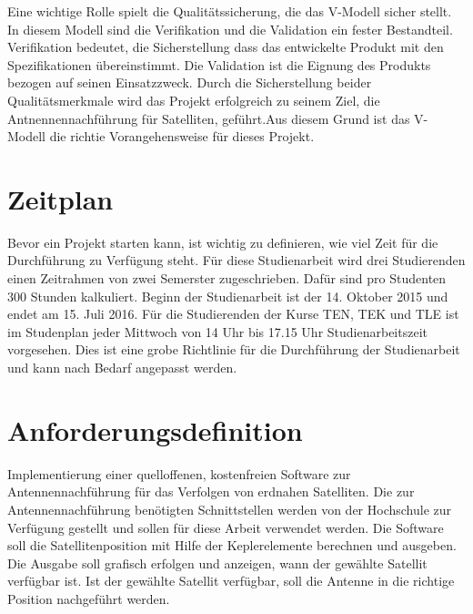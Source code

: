 Eine wichtige Rolle spielt die Qualitätssicherung, die das V-Modell sicher stellt. In diesem Modell sind die Verifikation und die Validation ein 
fester Bestandteil. Verifikation bedeutet, die Sicherstellung dass das entwickelte Produkt mit den Spezifikationen übereinstimmt.
Die Validation ist die Eignung des Produkts bezogen auf seinen Einsatzzweck. Durch die Sicherstellung beider Qualitätsmerkmale wird das Projekt 
erfolgreich zu seinem Ziel, die Antnennennachführung für Satelliten, geführt.Aus diesem Grund ist das V-Modell die richtie Vorangehensweise für 
dieses Projekt.
\newpar

\section{Zeitplan}
Bevor ein Projekt starten kann, ist wichtig  zu definieren, wie viel Zeit für die Durchführung zu Verfügung steht. Für diese Studienarbeit 
wird drei Studierenden einen Zeitrahmen von zwei Semerster zugeschrieben. Dafür sind pro Studenten 300 Stunden kalkuliert. Beginn der Studienarbeit 
ist der 14. Oktober 2015 und endet am 15. Juli 2016. Für die Studierenden der Kurse TEN, TEK und TLE ist im Studenplan jeder Mittwoch von 14 Uhr bis 
17.15 Uhr Studienarbeitszeit vorgesehen. Dies ist eine grobe Richtlinie für die Durchführung der Studienarbeit und kann nach Bedarf angepasst werden.
\newpar

\section{Anforderungsdefinition}
Implementierung einer quelloffenen, kostenfreien Software zur Antennennachführung für das Verfolgen von erdnahen Satelliten. Die zur Antennennachführung
benötigten Schnittstellen werden von der Hochschule zur Verfügung gestellt und sollen für diese Arbeit verwendet werden. Die Software soll die 
Satellitenposition mit Hilfe der Keplerelemente berechnen und ausgeben. Die Ausgabe soll grafisch erfolgen und anzeigen, wann
der gewählte Satellit verfügbar ist. Ist der gewählte Satellit verfügbar, soll die Antenne in die richtige Position nachgeführt werden. 
\newpar

